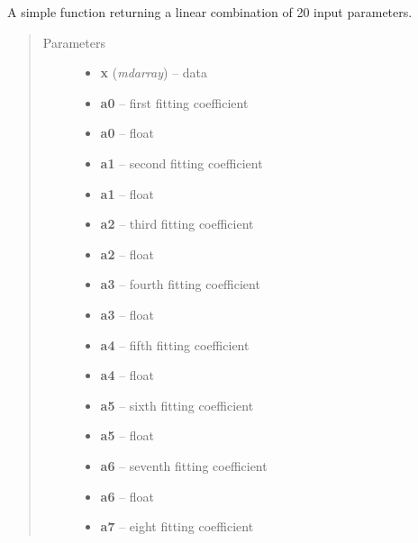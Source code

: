 \documentclass[a4paper,11pt,english]{sphinxmanual}
\begin{document}
\begin{fulllineitems}
\label{analysis:analysis.fitPSF.leastSQfit}
A simple function returning a linear combination of 20 input parameters.
\begin{quote}\begin{description}
\item[{Parameters}] \leavevmode\begin{itemize}
\item {} 
\textbf{x} (\emph{mdarray}) -- data

\item {} 
\textbf{a0} -- first fitting coefficient

\item {} 
\textbf{a0} -- float

\item {} 
\textbf{a1} -- second fitting coefficient

\item {} 
\textbf{a1} -- float

\item {} 
\textbf{a2} -- third fitting coefficient

\item {} 
\textbf{a2} -- float

\item {} 
\textbf{a3} -- fourth fitting coefficient

\item {} 
\textbf{a3} -- float

\item {} 
\textbf{a4} -- fifth fitting coefficient

\item {} 
\textbf{a4} -- float

\item {} 
\textbf{a5} -- sixth fitting coefficient

\item {} 
\textbf{a5} -- float

\item {} 
\textbf{a6} -- seventh fitting coefficient

\item {} 
\textbf{a6} -- float

\item {} 
\textbf{a7} -- eight fitting coefficient


\end{itemize}
\end{description}
\end{quote}
\end{fulllineitems}
\end{document}
